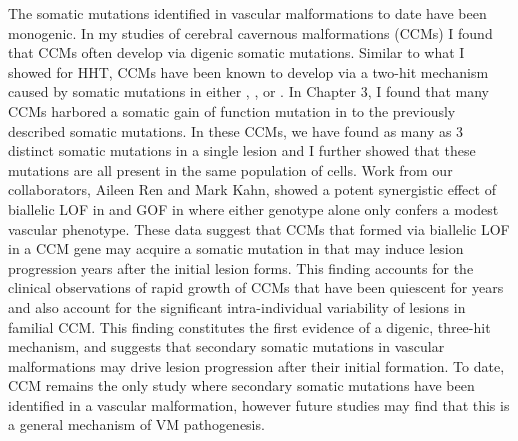 The somatic mutations identified in vascular malformations to date have been monogenic. In my studies of cerebral cavernous malformations (CCMs) I found that CCMs often develop via digenic somatic mutations. Similar to what I showed for HHT, CCMs have been known to develop via a two-hit mechanism caused by somatic mutations in either , , or . In Chapter 3, I found that many CCMs harbored a somatic gain of function mutation in   to the previously described somatic mutations. In these CCMs, we have found as many as 3 distinct somatic mutations in a single lesion and I further showed that these mutations are all present in the same population of cells. Work from our collaborators, Aileen Ren and Mark Kahn, showed a potent synergistic effect of biallelic LOF in  and GOF in  where either genotype alone only confers a modest vascular phenotype. These data suggest that CCMs that formed via biallelic LOF in a CCM gene may acquire a somatic mutation in  that may induce lesion progression years after the initial lesion forms. This finding accounts for the clinical observations of rapid growth of CCMs that have been quiescent for years and also account for the significant intra-individual variability of lesions in familial CCM. This finding constitutes the first evidence of a digenic, three-hit mechanism, and suggests that secondary somatic mutations in vascular malformations may drive lesion progression after their initial formation. To date, CCM remains the only study where secondary somatic mutations have been identified in a vascular malformation, however future studies may find that this is a general mechanism of VM pathogenesis. 

